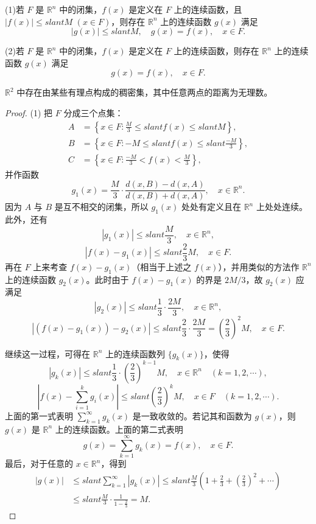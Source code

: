 \documentclass[../../main.tex]{subfiles}
\begin{document}
\begin{theorem}[连续延拓定理]\label{theorem:连续函数延拓定理}
(1)若 \(F\) 是 \(\mathbb{R}^n\) 中的闭集，\(f(x)\) 是定义在 \(F\) 上的连续函数，且 \(|f(x)|\leqslant slant M\) \((x\in F)\)，则存在 \(\mathbb{R}^n\) 上的连续函数 \(g(x)\) 满足
\[
|g(x)|\leqslant slant M, \quad g(x)=f(x), \quad x\in F.
\]

(2)若 \(F\) 是 \(\mathbb{R}^n\) 中的闭集，\(f(x)\) 是定义在 \(F\) 上的连续函数，则存在 \(\mathbb{R}^n\) 上的连续函数 \(g(x)\) 满足
\[
g(x)=f(x), \quad x\in F.
\]
\end{theorem}
\begin{remark}
\(\mathbb{R}^2\) 中存在由某些有理点构成的稠密集，其中任意两点的距离为无理数。 
\end{remark}
\begin{proof}
(1) 把 \(F\) 分成三个点集：
\begin{align*}
A&=\left\{x\in F:\frac{M}{3}\leqslant slant f(x)\leqslant slant M\right\},\\
B&=\left\{x\in F:-M\leqslant slant f(x)\leqslant slant\frac{-M}{3}\right\},\\
C&=\left\{x\in F:\frac{-M}{3}<f(x)<\frac{M}{3}\right\},
\end{align*}
并作函数
\[
g_1(x)=\frac{M}{3}\cdot\frac{d(x,B)-d(x,A)}{d(x,B)+d(x,A)}, \quad x\in\mathbb{R}^n.
\]
因为 \(A\) 与 \(B\) 是互不相交的闭集，所以 \(g_1(x)\) 处处有定义且在 \(\mathbb{R}^n\) 上处处连续。此外，还有
\[
|g_1(x)|\leqslant slant\frac{M}{3}, \quad x\in\mathbb{R}^n,
\]
\[
|f(x)-g_1(x)|\leqslant slant\frac{2}{3}M, \quad x\in F.
\]
再在 \(F\) 上来考查 \(f(x)-g_1(x)\)（相当于上述之 \(f(x)\)），并用类似的方法作 \(\mathbb{R}^n\) 上的连续函数 \(g_2(x)\)。此时由于 \(f(x)-g_1(x)\) 的界是 \(2M/3\)，故 \(g_2(x)\) 应满足
\[
|g_2(x)|\leqslant slant\frac{1}{3}\cdot\frac{2M}{3}, \quad x\in\mathbb{R}^n,
\]
\[
|(f(x)-g_1(x))-g_2(x)|\leqslant slant\frac{2}{3}\cdot\frac{2M}{3}=\left(\frac{2}{3}\right)^2M, \quad x\in F.
\]

继续这一过程，可得在 \(\mathbb{R}^n\) 上的连续函数列 \(\{g_k(x)\}\)，使得
\[
|g_k(x)|\leqslant slant\frac{1}{3}\cdot\left(\frac{2}{3}\right)^{k - 1}M, \quad x\in\mathbb{R}^n \quad (k = 1,2,\cdots),
\]
\[
\left|f(x)-\sum_{i = 1}^{k}g_i(x)\right|\leqslant slant\left(\frac{2}{3}\right)^kM, \quad x\in F \quad (k = 1,2,\cdots).
\]
上面的第一式表明 \(\sum_{k = 1}^{\infty}g_k(x)\) 是一致收敛的。若记其和函数为 \(g(x)\)，则 \(g(x)\) 是 \(\mathbb{R}^n\) 上的连续函数。上面的第二式表明
\[
g(x)=\sum_{k = 1}^{\infty}g_k(x)=f(x), \quad x\in F.
\]
最后，对于任意的 \(x\in\mathbb{R}^n\)，得到
\begin{align*}
|g(x)|&\leqslant slant\sum_{k = 1}^{\infty}|g_k(x)|\leqslant slant\frac{M}{3}\left(1+\frac{2}{3}+\left(\frac{2}{3}\right)^2+\cdots\right)\\
&\leqslant slant\frac{M}{3}\cdot\frac{1}{1 - \frac{2}{3}}=M.
\end{align*}


\end{proof}
\end{document}
